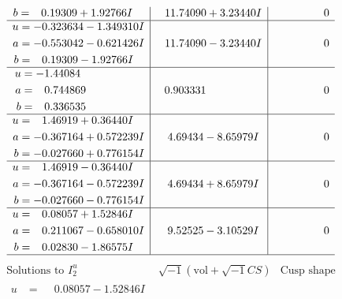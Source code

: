 \documentclass[1p]{elsarticle_modified}
\theoremstyle{definition}
\newcommand{\I}{\sqrt{-1}}
\begin{document}
$$\begin{array}{c|c|c}
\begin{aligned}
b &= \phantom{-}0.19309 + 1.92766 I\end{aligned}
 & \phantom{-}11.74090 + 3.23440 I & \phantom{-0.000000 } 0 \\ \hline\begin{aligned}
u &= -0.323634 - 1.349310 I \\
a &= -0.553042 - 0.621426 I \\
b &= \phantom{-}0.19309 - 1.92766 I\end{aligned}
 & \phantom{-}11.74090 - 3.23440 I & \phantom{-0.000000 } 0 \\ \hline\begin{aligned}
u &= -1.44084\phantom{ +0.000000I} \\
a &= \phantom{-}0.744869\phantom{ +0.000000I} \\
b &= \phantom{-}0.336535\phantom{ +0.000000I}\end{aligned}
 & \phantom{-}0.903331\phantom{ +0.000000I} & \phantom{-0.000000 } 0 \\ \hline\begin{aligned}
u &= \phantom{-}1.46919 + 0.36440 I \\
a &= -0.367164 + 0.572239 I \\
b &= -0.027660 + 0.776154 I\end{aligned}
 & \phantom{-}4.69434 - 8.65979 I & \phantom{-0.000000 } 0 \\ \hline\begin{aligned}
u &= \phantom{-}1.46919 - 0.36440 I \\
a &= -0.367164 - 0.572239 I \\
b &= -0.027660 - 0.776154 I\end{aligned}
 & \phantom{-}4.69434 + 8.65979 I & \phantom{-0.000000 } 0 \\ \hline\begin{aligned}
u &= \phantom{-}0.08057 + 1.52846 I \\
a &= \phantom{-}0.211067 - 0.658010 I \\
b &= \phantom{-}0.02830 - 1.86575 I\end{aligned}
 & \phantom{-}9.52525 - 3.10529 I & \phantom{-0.000000 } 0\\
 \hline 
 \end{array}$$\newpage$$\begin{array}{c|c|c}  
\text{Solutions to }I^u_{2}& \I (\text{vol} + \sqrt{-1}CS) & \text{Cusp shape}\\
 \hline 
\begin{aligned}
u &= \phantom{-}0.08057 - 1.52846 I \\

\end{aligned}
\end{array}$$
\end{document}
